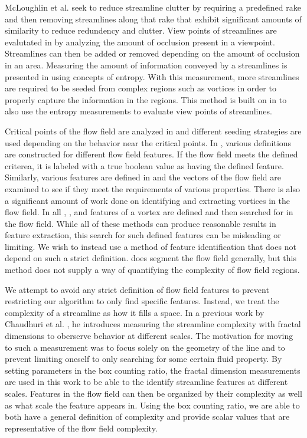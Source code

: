\documentclass{egpubl}
\begin{document}
McLoughlin et al. \cite{mcloughlin} seek to reduce streamline clutter by requiring a predefined rake and then removing streamlines along that rake that exhibit significant amounts of similarity to reduce redundency and clutter.
View points of streamlines are evalutated in \cite{marchesin} by analyzing the amount of occlusion present in a viewpoint.
Streamlines can then be added or removed depending on the amount of occlusion in an area.
Measuring the amount of information conveyed by a streamlines is presented in \cite{shen} using concepts of entropy.
With this measurement, more streamlines are required to be seeded from complex regions such as vortices in order to properly capture the information in the regions.
This method is built on in \cite{lee} to also use the entropy measurements to evaluate view points of streamlines.

Critical points of the flow field are analyzed in \cite{ye} and different seeding strategies are used depending on the behavior near the critical points.
In \cite{salzbrunn}, various definitions are constructed for different flow field features.
If the flow field meets the defined criterea, it is labeled with a true boolean value as having the defined feature.
Similarly, various features are defined in \cite{heiberg} and the vectors of the flow field are examined to see if they meet the requirements of various properties.
There is also a significant amount of work done on identifying and extracting vortices in the flow field.
In all \cite{sadarjoen1999}, \cite{sadarjoen1998}, and \cite{zhong} features of a vortex are defined and then searched for in the flow field.
While all of these methods can produce reasonable results in feature extraction, this search for such defined features can be misleading or limiting.
We wish to instead use a method of feature identification that does not depend on such a strict definition.
\cite{mahrous} does segment the flow field generally, but this method does not supply a way of quantifying the complexity of flow field regions.

We attempt to avoid any strict definition of flow field features to prevent restricting our algorithm to only find specific features. Instead, we treat the complexity of a streamline as how it fills a space. In a previous work by Chaudhuri et al. \cite{chaudhuri}, he introduces measuring the streamline complexity with fractal dimensions to oberserve behavior at different scales.
The motivation for moving to such a measurement was to focus solely on the geometry of the line and to prevent limiting oneself to only searching for some certain fluid property.
By setting parameters in the box counting ratio, the fractal dimension measurements are used in this work to be able to the identify streamline features at different scales.
Features in the flow field can then be organized by their complexity as well as what scale the feature appears in.
Using the box counting ratio, we are able to both have a general definition of complexity and provide scalar values that are representative of the flow field complexity.
\end{document}
